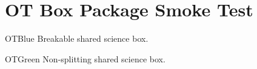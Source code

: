 \documentclass{article}
\begin{document}
\section*{OT Box Package Smoke Test}


\begin{otscibox}{OTBlue}
  Breakable shared science box.
\end{otscibox}

\begin{otsciboxnosplit}{OTGreen}
  Non-splitting shared science box.
\end{otsciboxnosplit}
\end{document}
